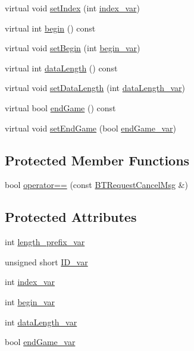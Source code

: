 \begin{DoxyCompactItemize}
\item 
virtual void \hyperlink{classBTRequestCancelMsg_a48765103941d1cd0ae71fc2876c59e8a}{set\+Index} (int \hyperlink{classBTRequestCancelMsg_a1a29c76d5ddedc01a0acd16e2bc5d486}{index\+\_\+var})
\item 
virtual int \hyperlink{classBTRequestCancelMsg_a9c930a1a2ce90214679b20f6743bdd90}{begin} () const 
\item 
virtual void \hyperlink{classBTRequestCancelMsg_ac8461136e209c077e4b21ca9da2b186f}{set\+Begin} (int \hyperlink{classBTRequestCancelMsg_a1e2ede018514b92b357f4cab8b54f4e9}{begin\+\_\+var})
\item 
virtual int \hyperlink{classBTRequestCancelMsg_aae352b170a0e9f0caf098faf9922ed05}{data\+Length} () const 
\item 
virtual void \hyperlink{classBTRequestCancelMsg_a4e9fd9942b70269215a1cd931b433f70}{set\+Data\+Length} (int \hyperlink{classBTRequestCancelMsg_abb5b6da6821328d4b5644d0522c6fe9d}{data\+Length\+\_\+var})
\item 
virtual bool \hyperlink{classBTRequestCancelMsg_ab668c78225c900ea6be01f457a0ce679}{end\+Game} () const 
\item 
virtual void \hyperlink{classBTRequestCancelMsg_ab5f2682a9c87700b2c4220bcae854c22}{set\+End\+Game} (bool \hyperlink{classBTRequestCancelMsg_a8ebc13d1af28901ca455cbda02c29d52}{end\+Game\+\_\+var})
\end{DoxyCompactItemize}
\subsection*{Protected Member Functions}
\begin{DoxyCompactItemize}
\item 
bool \hyperlink{classBTRequestCancelMsg_af65e9a160cd7d47736b09dcccea56868}{operator==} (const \hyperlink{classBTRequestCancelMsg}{B\+T\+Request\+Cancel\+Msg} \&)
\end{DoxyCompactItemize}
\subsection*{Protected Attributes}
\begin{DoxyCompactItemize}
\item 
int \hyperlink{classBTRequestCancelMsg_a77139c7bdc2e1a7885f20ddbb25acf5d}{length\+\_\+prefix\+\_\+var}
\item 
unsigned short \hyperlink{classBTRequestCancelMsg_ad687b551062827df1f6f9a65b6c19782}{I\+D\+\_\+var}
\item 
int \hyperlink{classBTRequestCancelMsg_a1a29c76d5ddedc01a0acd16e2bc5d486}{index\+\_\+var}
\item 
int \hyperlink{classBTRequestCancelMsg_a1e2ede018514b92b357f4cab8b54f4e9}{begin\+\_\+var}
\item 
int \hyperlink{classBTRequestCancelMsg_abb5b6da6821328d4b5644d0522c6fe9d}{data\+Length\+\_\+var}
\item 
bool \hyperlink{classBTRequestCancelMsg_a8ebc13d1af28901ca455cbda02c29d52}{end\+Game\+\_\+var}
\end{DoxyCompactItemize}


